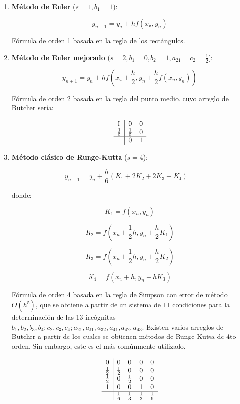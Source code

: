 \documentclass[a4paper,12pt]{article}
\begin{document}
\begin{enumerate}
    \item \textbf{Método de Euler} (\(s = 1, b_1 = 1\)):
    

\[ y_{n+1} = y_n + h f(x_n, y_n) \]


    Fórmula de orden 1 basada en la regla de los rectángulos.

    \item \textbf{Método de Euler mejorado} (\(s = 2, b_1 = 0, b_2 = 1, a_{21} = c_2 = \frac{1}{2}\)):
    

\[ y_{n+1} = y_n + h f \left( x_n + \frac{h}{2}, y_n + \frac{h}{2} f(x_n, y_n) \right) \]


    Fórmula de orden 2 basada en la regla del punto medio, cuyo arreglo de Butcher sería:
    

\[
    \begin{array}{c|cc}
    0 & 0 & 0 \\
    \frac{1}{2} & \frac{1}{2} & 0 \\
    \hline
    & 0 & 1 \\
    \end{array}
    \]

    \item \textbf{Método clásico de Runge-Kutta} (\(s = 4\)):
    

\[ y_{n+1} = y_n + \frac{h}{6} (K_1 + 2K_2 + 2K_3 + K_4) \quad \]


    donde:
    

\[ K_1 = f(x_n, y_n) \]


    

\[ K_2 = f \left( x_n + \frac{1}{2} h, y_n + \frac{h}{2} K_1 \right) \]


    

\[ K_3 = f \left( x_n + \frac{1}{2} h, y_n + \frac{h}{2} K_2 \right) \]


    

\[ K_4 = f (x_n + h, y_n + h K_3) \]

Fórmula de orden 4 basada en la regla de Simpson con error de método \(O(h^5)\), que se obtiene a partir de un sistema de 11 condiciones para la determinación de las 13 incógnitas \(b_1, b_2, b_3, b_4; c_2, c_3, c_4; a_{21}, a_{31}, a_{32}, a_{41}, a_{42}, a_{43}\). Existen varios arreglos de Butcher a partir de los cuales se obtienen métodos de Runge-Kutta de 4to orden. Sin embargo, este es el más comúnmente utilizado.

\[
\begin{array}{c|cccc}
    0 & 0 & 0 & 0 & 0\\
    \frac{1}{2} & \frac{1}{2} & 0 & 0 & 0\\
    \frac{1}{2} & 0 & \frac{1}{2} & 0 & 0 \\
    1 & 0 & 0 & 1 & 0\\
    \hline
    & \frac{1}{6} & \frac{1}{3} & \frac{1}{3} & \frac{1}{6}\\
    \end{array}
    \]
\end{enumerate}
\end{document}
